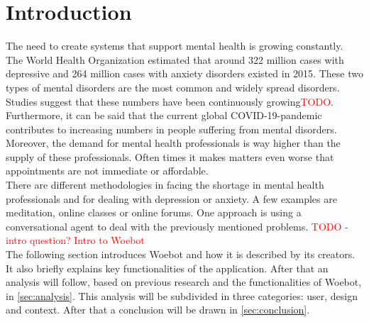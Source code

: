 \section{Introduction}
The need to create systems that support mental health is growing constantly. The World Health Organization estimated that around 322 million cases with depressive and 264 million cases with anxiety disorders existed in 2015\cite{who2017}. These two types of mental disorders are the most common and widely spread disorders. Studies suggest that these numbers have been continuously growing\cite{}\textcolor{red}{TODO}. Furthermore, it can be said that the current global COVID-19-pandemic contributes to increasing numbers in people suffering from mental disorders\cite{corona-mental}. Moreover, the demand for mental health professionals is way higher than the supply of these professionals\cite{indian-shortage, rural-shortage}. Often times it makes matters even worse that appointments are not immediate or affordable.\\

There are different methodologies in facing the shortage in mental health professionals and for dealing with depression or anxiety. A few examples are meditation, online classes or online forums. One approach is using a conversational agent to deal with the previously mentioned problems. \textcolor{red}{TODO - intro question?} \textcolor{red}{Intro to Woebot}\\

The following section introduces Woebot and how it is described by its creators. It also briefly explains key functionalities of the application. After that an analysis will follow, based on previous research and the functionalities of Woebot, in \autoref{sec:analysis}. This analysis will be subdivided in three categories: user, design and context. After that a conclusion will be drawn in \autoref{sec:conclusion}.

